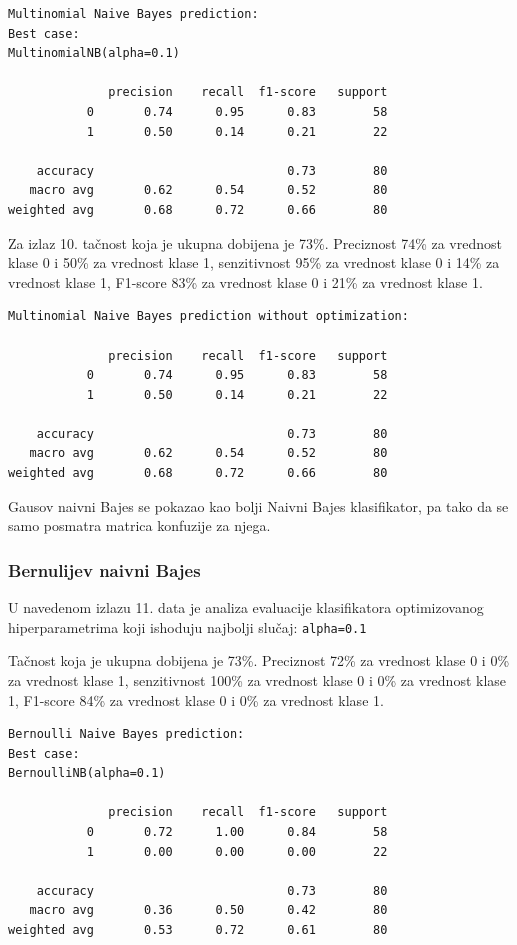 \documentclass[fontsize=12bp, paper=a4]{scrarticle}
\begin{document}
\begin{lstlisting}[caption=Multinomijalni naivni Bajes sa optimizacijom hiperparametara]
Multinomial Naive Bayes prediction:
Best case:
MultinomialNB(alpha=0.1)

              precision    recall  f1-score   support
           0       0.74      0.95      0.83        58
           1       0.50      0.14      0.21        22

    accuracy                           0.73        80
   macro avg       0.62      0.54      0.52        80
weighted avg       0.68      0.72      0.66        80
\end{lstlisting}

Za izlaz 10. tačnost koja je ukupna dobijena je 73\%. Preciznost 74\% za vrednost klase 0 i 50\% za vrednost klase 1, senzitivnost 95\% za vrednost klase 0 i 14\% za vrednost klase 1, F1-score 83\% za vrednost klase 0 i 21\% za vrednost klase 1.

\begin{lstlisting}[caption=Multinomijalni naivni Bajes bez optimizacije hiperparametara]
Multinomial Naive Bayes prediction without optimization:

              precision    recall  f1-score   support
           0       0.74      0.95      0.83        58
           1       0.50      0.14      0.21        22

    accuracy                           0.73        80
   macro avg       0.62      0.54      0.52        80
weighted avg       0.68      0.72      0.66        80
\end{lstlisting}

Gausov naivni Bajes se pokazao kao bolji Naivni Bajes klasifikator, pa tako da se samo posmatra matrica konfuzije za njega.

\subsubsection{Bernulijev naivni Bajes}

U navedenom izlazu 11. data je analiza evaluacije klasifikatora 
 optimizovanog hiperparametrima koji ishoduju najbolji slučaj: \verb|alpha=0.1|
 
 Tačnost koja je ukupna dobijena je 73\%. Preciznost 72\% za vrednost klase 0 i 0\% za vrednost klase 1, senzitivnost 100\% za vrednost klase 0 i 0\% za vrednost klase 1, F1-score 84\% za vrednost klase 0 i 0\% za vrednost klase 1.

\begin{lstlisting}[caption=Bernuli naivni Bajes sa optimizacijom hiperparametara]
Bernoulli Naive Bayes prediction:
Best case:
BernoulliNB(alpha=0.1)

              precision    recall  f1-score   support
           0       0.72      1.00      0.84        58
           1       0.00      0.00      0.00        22

    accuracy                           0.73        80
   macro avg       0.36      0.50      0.42        80
weighted avg       0.53      0.72      0.61        80
\end{lstlisting}
\end{document}
